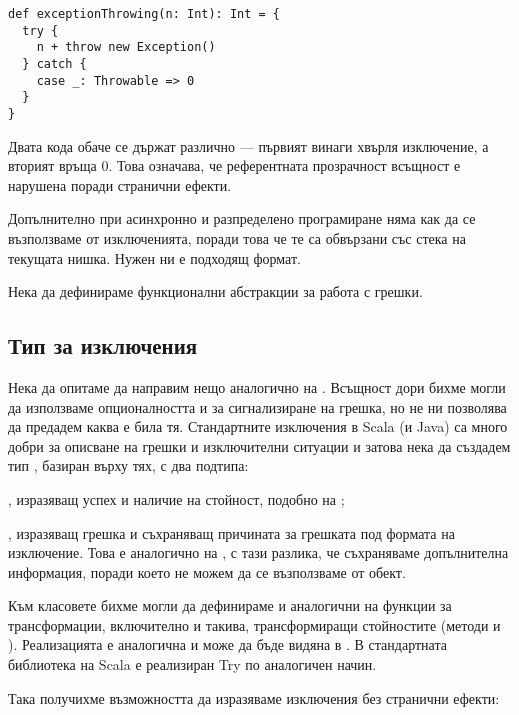 \begin{lstlisting}
def exceptionThrowing(n: Int): Int = {
  try {
    n + throw new Exception()
  } catch {
    case _: Throwable => 0
  }
}
\end{lstlisting}

Двата кода обаче се държат различно — първият винаги хвърля изключение, а вторият връща 0. Това означава, че референтната прозрачност всъщност е нарушена поради странични ефекти.

Допълнително при асинхронно и разпределено програмиране няма как да се възползваме от изключенията, поради това че те са обвързани със стека на текущата нишка. Нужен ни е подходящ формат.

Нека да дефинираме функционални абстракции за работа с грешки.

\subsection{Тип за изключения }

Нека да опитаме да направим нещо аналогично на . Всъщност дори бихме могли да използваме опционалността и  за сигнализиране на грешка, но  не ни позволява да предадем каква е била тя. Стандартните изключения в Scala (и Java) са много добри за описване на грешки и изключителни ситуации и затова нека да създадем тип , базиран върху тях, с два подтипа:

\begin{itemize*}
  \item {}, изразяващ успех и наличие на стойност, подобно на ;
  \item {}, изразяващ грешка и съхраняващ причината за грешката под формата на изключение. Това е аналогично на , с тази разлика, че съхраняваме допълнителна информация, поради което не можем да се възползваме от  обект.
\end{itemize*}

Към класовете бихме могли да дефинираме и аналогични на  функции за трансформации, включително и такива, трансформиращи  стойностите (методи  и ). Реализацията е аналогична и може да бъде видяна в . В стандартната библиотека на Scala е реализиран Try по аналогичен начин.

Така получихме възможността да изразяваме изключения без странични ефекти:

